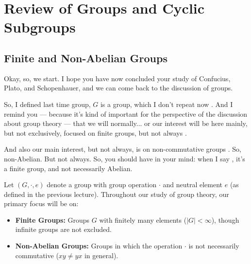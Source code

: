 \section{Review of Groups and Cyclic Subgroups}

\subsection{Finite and Non-Abelian Groups}

\begin{speech}[00:00:00 - 00:01:02]
Okay, so, we start. I hope you have now concluded your study of Confucius, Plato, and Schopenhauer, and we can come back to the discussion of groups.

So, I defined last time group, $G$ is a group, which I don't repeat now . And I remind you --- because it's kind of important for the perspective of the discussion about group theory --- that we will normally... or our interest will be here mainly, but not exclusively, focused on finite groups, but not always .

And also our main interest, but not always, is on non-commutative groups . So, non-Abelian. But not always. So, you should have in your mind: when I say , it's a finite group, and not necessarily Abelian.
\end{speech}

\begin{content}

Let $(G, \cdot, e)$ denote a group with group operation $\cdot$ and neutral element $e$ (as defined in the previous lecture). Throughout our study of group theory, our primary focus will be on:
\begin{itemize}
    \item \textbf{Finite Groups:} Groups $G$ with finitely many elements ($|G| < \infty$), though infinite groups are not excluded.
    \item \textbf{Non-Abelian Groups:} Groups in which the operation $\cdot$ is not necessarily commutative ($xy \neq yx$ in general).
\end{itemize}
\end{content}

